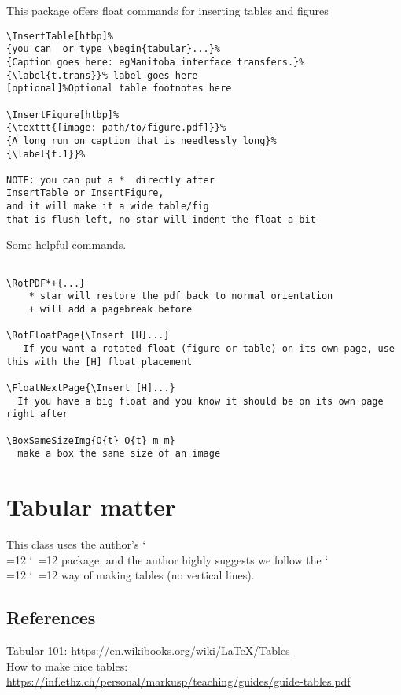 \documentclass{\FormatDir corpboreportMulti}
\def\cmd{\bgroup\catcode`\\=12 \catcode`\ =12 \cmdA}
\def\cmdA#1{\egroup{\texttt{\detokenize{#1}}}}
\begin{document}
This package offers float commands for inserting tables and figures

\begin{lstlisting}
\InsertTable[htbp]%
{you can  or type \begin{tabular}...}%
{Caption goes here: egManitoba interface transfers.}%
{\label{t.trans}}% label goes here
[optional]%Optional table footnotes here

\InsertFigure[htbp]%
{\texttt{[image: path/to/figure.pdf]}}%
{A long run on caption that is needlessly long}%
{\label{f.1}}%

NOTE: you can put a *  directly after
InsertTable or InsertFigure,
and it will make it a wide table/fig
that is flush left, no star will indent the float a bit
\end{lstlisting}


Some helpful commands.

\begin{lstlisting}

\RotPDF*+{...}
	* star will restore the pdf back to normal orientation
	+ will add a pagebreak before

\RotFloatPage{\Insert [H]...}
   If you want a rotated float (figure or table) on its own page, use this with the [H] float placement

\FloatNextPage{\Insert [H]...}
  If you have a big float and you know it should be on its own page right after

\BoxSameSizeImg{O{t} O{t} m m}
  make a box the same size of an image
\end{lstlisting}



\section{Tabular matter}

This class uses the author's \cmd{lutabulartools} package, and the author highly suggests we follow
the \cmd{booktabs} way of making tables (no vertical lines).


\subsection{References}

Tabular 101: \url{https://en.wikibooks.org/wiki/LaTeX/Tables}\\
How to make nice tables: \url{https://inf.ethz.ch/personal/markusp/teaching/guides/guide-tables.pdf}
\end{document}
